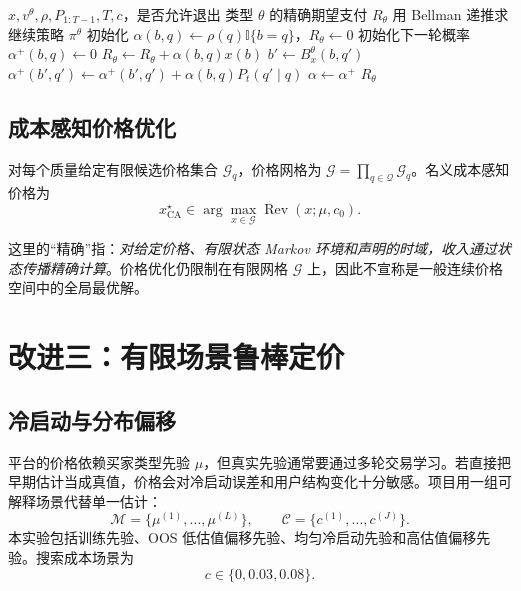 \documentclass[11pt,a4paper]{ctexart}
\newcommand{\Qset}{\mathcal Q}
\newcommand{\Priors}{\mathcal M}
\newcommand{\Costs}{\mathcal C}
\newcommand{\Grid}{\mathcal G}
\newcommand{\Rev}{\operatorname{Rev}}
\newcommand{\ind}{\mathbb I}
\begin{document}
\begin{algorithm}[H]
\caption{给定价格下的精确 Markov 期望支付}
\begin{algorithmic}[1]
\Require $x,v^\theta,\rho,P_{1:T-1},T,c$，是否允许退出
\Ensure 类型 $\theta$ 的精确期望支付 $R_\theta$
\State 用 Bellman 递推求继续策略 $\pi^\theta$
\State 初始化 $\alpha(b,q)\gets\rho(q)\ind\{b=q\}$，$R_\theta\gets0$
  \State 初始化下一轮概率 $\alpha^+(b,q)\gets0$
        \State $R_\theta\gets R_\theta+\alpha(b,q)x(b)$
      \EndIf
    \Else
        \State $b'\gets B^\theta_x(b,q')$
        \State $\alpha^+(b',q')\gets\alpha^+(b',q')+\alpha(b,q)P_t(q'\mid q)$
      \EndFor
    \EndIf
  \EndFor
  \State $\alpha\gets\alpha^+$
\EndFor
\State \Return $R_\theta$
\end{algorithmic}
\end{algorithm}

\subsection{成本感知价格优化}

对每个质量给定有限候选价格集合 $\Grid_q$，价格网格为
$\Grid=\prod_{q\in\Qset}\Grid_q$。名义成本感知价格为
\[
x_{\mathrm{CA}}^\star
\in\arg\max_{x\in\Grid}\Rev(x;\mu,c_0).
\]

这里的“精确”指：\emph{对给定价格、有限状态 Markov 环境和声明的时域，收入通过状态传播精确计算}。价格优化仍限制在有限网格 $\Grid$ 上，因此不宣称是一般连续价格空间中的全局最优解。

\section{改进三：有限场景鲁棒定价}

\subsection{冷启动与分布偏移}

平台的价格依赖买家类型先验 $\mu$，但真实先验通常要通过多轮交易学习。若直接把早期估计当成真值，价格会对冷启动误差和用户结构变化十分敏感。项目用一组可解释场景代替单一估计：
\[
\Priors=\{\mu^{(1)},\ldots,\mu^{(L)}\},\qquad
\Costs=\{c^{(1)},\ldots,c^{(J)}\}.
\]
本实验包括训练先验、OOS 低估值偏移先验、均匀冷启动先验和高估值偏移先验。搜索成本场景为
\[
c\in\{0,0.03,0.08\}.
\]
\end{document}
